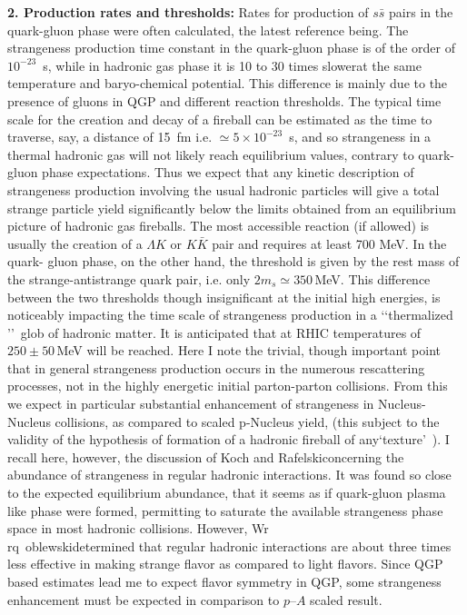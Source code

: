 \begin{mdframed}[linecolor=gray,roundcorner=12pt,backgroundcolor=Dandelion!15,linewidth=1pt,leftmargin=0cm,rightmargin=0cm,topline=true,bottomline=true,skipabove=12pt]
{\bf 2. Production rates and thresholds:} Rates for production of $s\bar s$ pairs in the quark-gluon phase were often calculated, the latest reference being\footnotemark[8]. The strangeness production time constant in the quark-gluon phase is of the order of $10^{-23}$~s, while in hadronic gas phase it is 10 to 30 times slower\footnotemark[12] at the same temperature and baryo-chemical potential. This difference is mainly due to the presence of gluons in QGP and different reaction thresholds. The typical time scale for the creation and decay of a fireball can be estimated as the time to traverse, say, a distance of 15~fm i.e. $\simeq 5\times 10^{-23}$~s, and so strangeness in a thermal hadronic gas will not likely reach equilibrium values, contrary to quark-gluon phase expectations. Thus we expect that any kinetic description of strangeness production involving the usual hadronic particles will give a total strange particle yield significantly below the limits obtained from an equilibrium picture of hadronic gas fireballs. The most accessible reaction (if allowed) is usually the creation of a $\Lambda K$ or $K\bar K$ pair and requires at least 700 MeV. In the quark- gluon phase, on the other hand, the threshold is given by the rest mass of the strange-antistrange quark pair, i.e. only $2 m_s \simeq 350$\,MeV. This difference between the two thresholds though insignificant at the initial high energies, is noticeably impacting the time scale of strangeness production in a \lq\lq thermalized \rq\rq\ glob of hadronic matter. It is anticipated that at RHIC temperatures of $250\pm 50$\,MeV will be reached. Here I note the trivial, though important point that in general strangeness production occurs in the numerous rescattering processes, not in the highly energetic initial parton-parton collisions. From this we expect in particular substantial enhancement of strangeness in Nucleus-Nucleus collisions, as compared to scaled p-Nucleus yield, (this subject to the validity of the hypothesis of formation of a hadronic fireball of any\lq texture\rq\ ). I recall here, however, the discussion of Koch and Rafelski\footnotemark[13] concerning the abundance of strangeness in regular hadronic interactions. It was found so close to the expected equilibrium abundance, that it seems as if quark-gluon plasma like phase were formed, permitting to saturate the available strangeness phase space in most hadronic collisions. However, Wr\\rq\ oblewski\footnotemark[14] determined that regular hadronic interactions are about three times less effective in making strange flavor as compared to light flavors. Since QGP based estimates lead me to expect flavor symmetry in QGP, some strangeness enhancement must be expected in comparison to $p$--$A$ scaled result. 


\end{mdframed}
